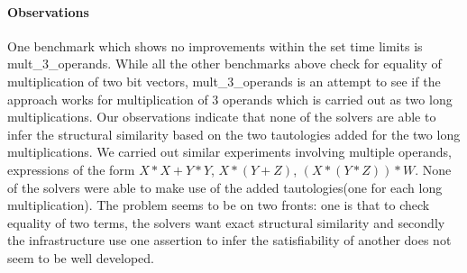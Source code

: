 \paragraph{\bf Observations}
%
One benchmark which shows no improvements within the set time limits is mult\_3\_operands. While all the other benchmarks above check for equality of multiplication of two bit vectors, mult\_3\_operands is an attempt to see if the approach works for multiplication of 3 operands which is carried out as two long multiplications. Our observations indicate that none of the solvers are able to infer the structural similarity based on the two tautologies added for the two long multiplications. We carried out similar experiments involving multiple operands, expressions of the form $X*X + Y*Y$, $X*(Y+Z)$, $(X*(Y*Z))*W$. None of the solvers were able to make use of the added tautologies(one for each long multiplication). The problem seems to be on two fronts: one is that to check equality of two terms, the solvers want exact structural similarity and secondly the infrastructure use one assertion to infer the satisfiability of another does not seem to be well developed. 





